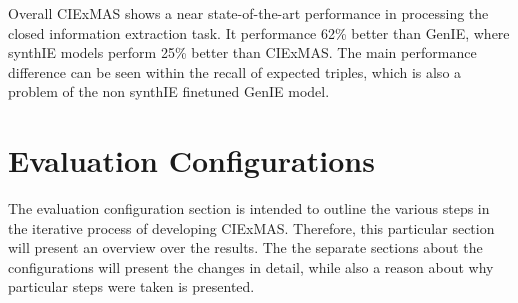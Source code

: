 \documentclass[a4paper,oneside,bibliography=totoc]{scrbook}
\begin{document}
Overall CIExMAS shows a near state-of-the-art performance in processing the closed information extraction task. It performance 62\% better than GenIE, where synthIE models perform 25\% better than CIExMAS. The main performance difference can be seen within the recall of expected triples, which is also a problem of the non synthIE finetuned GenIE model.

\section{Evaluation Configurations}
\label{sec:evaluation_configurations}

The evaluation configuration section is intended to outline the various steps in the iterative process of developing CIExMAS. Therefore, this particular section will present an overview over the results. The the separate sections about the configurations will present the changes in detail, while also a reason about why particular steps were taken is presented.
\end{document}
